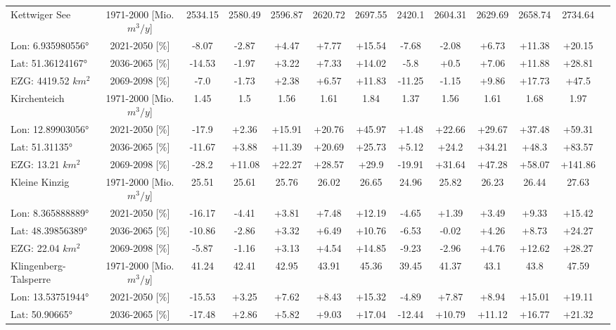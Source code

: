 \begin{longtable}{@{\extracolsep{\fill}}lc|ccccc||cccccc}
\hline 
Kettwiger See & 1971-2000 [Mio. $m^3/y$]  & 2534.15 & 2580.49 & 2596.87 & 2620.72 & 2697.55 & 2420.1 & 2604.31 & 2629.69 & 2658.74 & 2734.64 & \\ 
\cline{2-13} 
Lon: 6.935980556° & 2021-2050 [\%]  & -8.07 & -2.87 & +4.47 & +7.77 & +15.54 & -7.68 & -2.08 & +6.73 & +11.38 & +20.15 & \\ 
Lat: 51.36124167° & 2036-2065 [\%]  & -14.53 & -1.97 & +3.22 & +7.33 & +14.02 & -5.8 & +0.5 & +7.06 & +11.88 & +28.81 & \\ 
EZG: 4419.52 $km^2$ & 2069-2098 [\%]  & -7.0 & -1.73 & +2.38 & +6.57 & +11.83 & -11.25 & -1.15 & +9.86 & +17.73 & +47.5 & \\ 
\hline 
Kirchenteich & 1971-2000 [Mio. $m^3/y$]  & 1.45 & 1.5 & 1.56 & 1.61 & 1.84 & 1.37 & 1.56 & 1.61 & 1.68 & 1.97 & \\ 
\cline{2-13} 
Lon: 12.89903056° & 2021-2050 [\%]  & -17.9 & +2.36 & +15.91 & +20.76 & +45.97 & +1.48 & +22.66 & +29.67 & +37.48 & +59.31 & \\ 
Lat: 51.31135° & 2036-2065 [\%]  & -11.67 & +3.88 & +11.39 & +20.69 & +25.73 & +5.12 & +24.2 & +34.21 & +48.3 & +83.57 & \\ 
EZG: 13.21 $km^2$ & 2069-2098 [\%]  & -28.2 & +11.08 & +22.27 & +28.57 & +29.9 & -19.91 & +31.64 & +47.28 & +58.07 & +141.86 & \\ 
\hline 
Kleine Kinzig & 1971-2000 [Mio. $m^3/y$]  & 25.51 & 25.61 & 25.76 & 26.02 & 26.65 & 24.96 & 25.82 & 26.23 & 26.44 & 27.63 & \\ 
\cline{2-13} 
Lon: 8.365888889° & 2021-2050 [\%]  & -16.17 & -4.41 & +3.81 & +7.48 & +12.19 & -4.65 & +1.39 & +3.49 & +9.33 & +15.42 & \\ 
Lat: 48.39856389° & 2036-2065 [\%]  & -10.86 & -2.86 & +3.32 & +6.49 & +10.76 & -6.53 & -0.02 & +4.26 & +8.73 & +24.27 & \\ 
EZG: 22.04 $km^2$ & 2069-2098 [\%]  & -5.87 & -1.16 & +3.13 & +4.54 & +14.85 & -9.23 & -2.96 & +4.76 & +12.62 & +28.27 & \\ 
\hline 
Klingenberg-Talsperre & 1971-2000 [Mio. $m^3/y$]  & 41.24 & 42.41 & 42.95 & 43.91 & 45.36 & 39.45 & 41.37 & 43.1 & 43.8 & 47.59 & \\ 
\cline{2-13} 
Lon: 13.53751944° & 2021-2050 [\%]  & -15.53 & +3.25 & +7.62 & +8.43 & +15.32 & -4.89 & +7.87 & +8.94 & +15.01 & +19.11 & \\ 
Lat: 50.90665° & 2036-2065 [\%]  & -17.48 & +2.86 & +5.82 & +9.03 & +17.04 & -12.44 & +10.79 & +11.12 & +16.77 & +21.32 & \\ 

\end{longtable}
